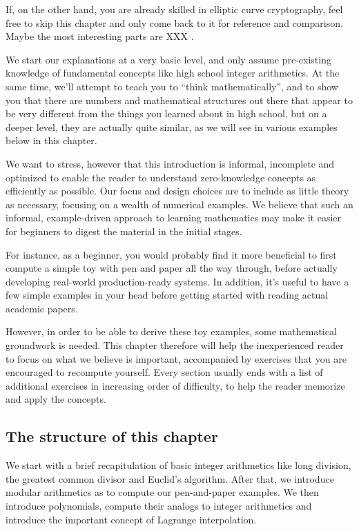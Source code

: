 If, on the other hand, you are already skilled in elliptic curve cryptography, feel free to skip this chapter and only come back to it for reference and comparison. Maybe the most interesting parts are XXX .

We start our explanations at a very basic level, and only assume pre-existing knowledge of fundamental concepts like high school integer arithmetics. At the same time, we'll attempt to teach you to ``think mathematically'', and to show you that there are numbers and mathematical structures out there that appear to be very different from the things you learned about in high school, but on a deeper level, they are actually quite similar, as we will see in various examples below in this chapter.

We want to stress, however that this introduction is informal, incomplete and optimized to enable the reader to understand zero-knowledge concepts as efficiently as possible. Our focus and design choices are to include as little theory as necessary, focusing on a wealth of numerical examples. We believe that such an informal, example-driven approach to learning mathematics may make it easier for beginners to digest the material in the initial stages. 

For instance, as a beginner, you would probably find it more beneficial to first compute a simple toy  with pen and paper all the way through, before actually developing real-world production-ready systems. In addition, it's useful to have a few simple examples in your head before getting started with reading actual academic papers.

However, in order to be able to derive these toy examples, some mathematical groundwork is needed. This chapter therefore will help the inexperienced reader to focus on what we believe is important, accompanied by exercises that you are encouraged to recompute yourself. Every section usually ends with a list of additional exercises in increasing order of difficulty, to help the reader memorize and apply the concepts. 


\subsection{The structure of this chapter}

We start with a brief recapitulation of basic integer arithmetics like long division, the greatest common divisor and Euclid's algorithm. After that, we introduce modular arithmetics as   to compute our pen-and-paper examples. We then introduce polynomials, compute their analogs to integer arithmetics and introduce the important concept of Lagrange interpolation.

